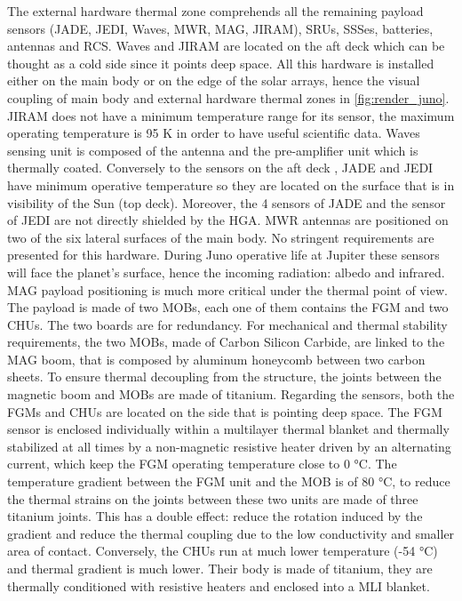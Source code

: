     The external hardware thermal zone comprehends all the remaining payload sensors (JADE, JEDI, Waves, MWR, MAG, JIRAM), SRUs, SSSes, batteries, antennas and RCS. Waves and JIRAM are located on the aft deck which can be thought as a cold side since it points deep space. All this hardware is installed either on the main body or on the edge of the solar arrays, hence the visual coupling of main body and external hardware thermal zones in \autoref{fig:render_juno}. JIRAM does not have a minimum temperature range for its sensor, the maximum operating temperature is 95 K in order to have useful scientific data.\cite{JIRAM_info} Waves sensing unit is composed of the antenna and the pre-amplifier unit which is thermally coated. Conversely to the sensors on the aft deck \cite{Waves_info}, JADE and JEDI have minimum operative temperature so they are located on the surface that is in visibility of the Sun (top deck). Moreover, the 4 sensors of JADE and the sensor of JEDI are not directly shielded by the HGA. \cite{JADE_info} \cite{JEDI_info} MWR antennas are positioned on two of the six lateral surfaces of the main body. \cite{MWR_info} No stringent requirements are presented for this hardware. During Juno operative life at Jupiter these sensors will face the planet's surface, hence the incoming radiation: albedo and infrared. 
    MAG payload positioning is much more critical under the thermal point of view. The payload is made of two MOBs, each one of them contains the FGM and two CHUs. The two boards are for redundancy. 
    For mechanical and thermal stability requirements, the two MOBs, made of Carbon Silicon Carbide, are linked to the MAG boom, that is composed by aluminum honeycomb between two carbon sheets. To ensure thermal decoupling from the structure, the joints between the magnetic boom and MOBs are made of titanium. 
    Regarding the sensors, both the FGMs and CHUs are located on the side that is pointing deep space.
    The FGM sensor is enclosed individually within a multilayer thermal blanket and thermally stabilized at all times by a non-magnetic resistive heater driven by an alternating current, which keep the FGM operating temperature close to 0 °C. The temperature gradient between the FGM unit and the MOB is of 80 °C, to reduce the thermal strains on the joints between these two units are made of three titanium joints.  This has a double effect: reduce the rotation induced by the gradient and reduce the thermal coupling due to the low conductivity and smaller area of contact.
    Conversely, the CHUs run at much lower temperature (-54 °C) and thermal gradient is much lower. Their body is made of titanium, they are thermally conditioned with resistive heaters and enclosed into a MLI blanket.  


